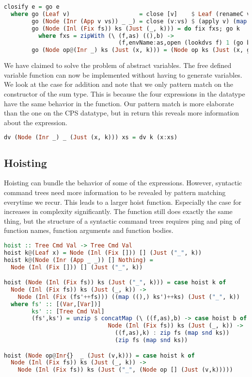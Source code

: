 \begin{lstlisting}[language=Haskell]
closify e = go e
  where go (Leaf v)                    = close [v]    $ Leaf (renameC v)
        go (Node (Inr (App v vs)) _ _) = close (v:vs) $ (apply v) (map renameC vs)
        go (Node (Inl (Fix fs)) ks (Just (_, k))) = do fix fxs; go k
          where fxs = zipWith (\ (f,as) ((),b) ->
                                 (f,envName:as,open (lookdvs f) 1 (go b))) fs ks
        go (Node op@(Inr _) ks (Just (x, k))) = (Node op ks (Just (x, go k)))
\end{lstlisting}

We have claimed to solve the problem of abstract variables. The free defined variable function  can now be implemented without having to generate variables. We look at the case for addition and note that we only pattern match on the constructor of the sum type. This is because the four expressions in the  datatype have the same behavior in the  function. Our pattern match is more elaborate than the one on the \ac{CPS} datatype, but in return this reveals more information about the expression.

\begin{lstlisting}[language=Haskell]
dv (Node (Inr _) _ (Just (x, k))) xs = dv k (x:xs)
\end{lstlisting}

\subsection{\label{subsection:hoist2}Hoisting}
Hoisting can bundle the behavior of some of the  expressions. However, syntactic command trees need more information to be revealed by pattern matching everytime we recur. This leads to a larger hoist function. Especially the case for  increases in complexity significantly. The function still does exactly the same thing, but the structure of a syntactic command trees requires ping and ping of function names, function arguments and function bodies.

\begin{lstlisting}[language=Haskell]
hoist :: Tree Cmd Val -> Tree Cmd Val
hoist k@(Leaf x) = Node (Inl (Fix [])) [] (Just ("_", k))
hoist k@(Node (Inr (App _ _)) [] Nothing) =
  Node (Inl (Fix [])) [] (Just ("_", k))

hoist (Node (Inl (Fix fs)) ks (Just ("_", k))) = case hoist k of
  Node (Inl (Fix fs)) ks (Just (_, k)) ->
    Node (Inl (Fix (fs'++fs))) ((map ((),) ks')++ks) (Just ("_", k))
  where fs' :: [(Var,[Var])]
        ks' :: [Tree Cmd Val]
        (fs',ks') = unzip $ concatMap (\ ((f,as),b) -> case hoist b of
                              Node (Inl (Fix fs)) ks (Just (_, k)) ->
                                ((f,as),k) : zip fs (map snd ks))
                                (zip fs (map snd ks))

hoist (Node op@Inr{}  _ (Just (v,k))) = case hoist k of
  Node (Inl (Fix fs)) ks (Just (_, k)) ->
    Node (Inl (Fix fs)) ks (Just ("_", (Node op [] (Just (v,k)))))
\end{lstlisting}

